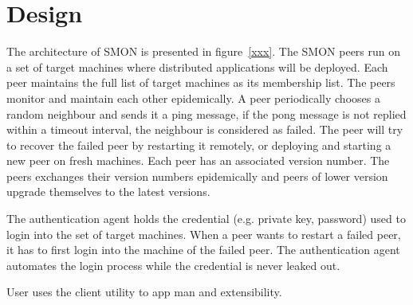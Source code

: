 \section{Design}
\label{sec:design}

The architecture of SMON is presented in figure~\ref{xxx}.
The SMON peers run on a set of target machines where
distributed applications will be deployed. Each peer
maintains the full list of target machines as its membership
list. The peers monitor and maintain each other
epidemically. A peer periodically chooses a random neighbour
and sends it a ping message, if the pong message is not
replied within a timeout interval, the neighbour is
considered as failed. The peer will try to recover the
failed peer by restarting it remotely, or deploying and
starting a new peer on fresh machines. Each peer has an
associated version number. The peers exchanges their version
numbers epidemically and peers of lower version upgrade
themselves to the latest versions.

The authentication agent holds the credential (e.g. private
key, password) used to login into the set of target
machines. When a peer wants to restart a failed peer, it has
to first login into the machine of the failed peer. The
authentication agent automates the login process while the
credential is never leaked out.

User uses the client utility to 
app man and extensibility.

